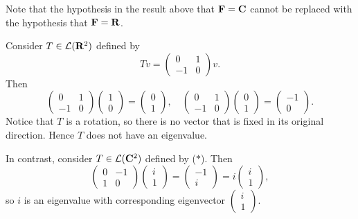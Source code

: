 \begin{example}
Note that the hypothesis in the result above that $\mathbf F=\mathbf C$ cannot be replaced with the hypothesis that $\mathbf F=\mathbf R$.

Consider $T\in\mathcal{L}(\mathbf R^2)$ defined by
\begin{equation*}\tag{$\ast$}
Tv=\begin{pmatrix}
0&1\\
-1&0
\end{pmatrix}v.
\end{equation*}
Then
\[\begin{pmatrix}
0&1\\
-1&0
\end{pmatrix}\begin{pmatrix}
1\\0
\end{pmatrix}=\begin{pmatrix}
0\\1
\end{pmatrix},\quad
\begin{pmatrix}
0&1\\
-1&0
\end{pmatrix}\begin{pmatrix}
0\\1
\end{pmatrix}=\begin{pmatrix}
-1\\0
\end{pmatrix}.\]
Notice that $T$ is a rotation, so there is no vector that is fixed in its original direction. Hence $T$ does not have an eigenvalue.

In contrast, consider $T\in\mathcal{L}(\mathbf C^2)$ defined by ($\ast$). Then 
\[\begin{pmatrix}
0&-1\\
1&0
\end{pmatrix}\begin{pmatrix}
i\\1
\end{pmatrix}=\begin{pmatrix}
-1\\i
\end{pmatrix}=i\begin{pmatrix}
i\\1
\end{pmatrix},\]
so $i$ is an eigenvalue with corresponding eigenvector $\begin{pmatrix}i\\1\end{pmatrix}$.
\end{example}

